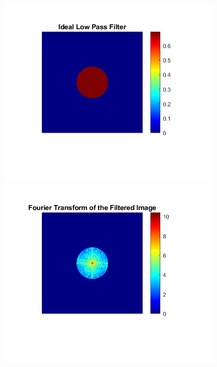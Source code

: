 \documentclass{article}
\begin{document}
\begin{figure}[!htb]
    \centering
    \begin{minipage}[b]{0.3\textwidth}
        \includegraphics[width=\textwidth]{Ideal_Low_Pass_Filter_80.png}
    \end{minipage}
    \begin{minipage}[b]{0.3\textwidth}
        \includegraphics[width=\textwidth]{Fourier_Transform_Filtered_80.png}

\end{minipage}
\end{figure}
\end{document}
